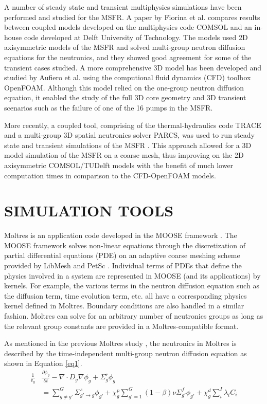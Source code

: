 \documentclass{anstrans}
\begin{document}
A number of steady state and transient multiphysics simulations have been performed and studied for the MSFR. A paper by Fiorina et al. \cite{fiorina_modelling_2014} compares results between coupled models developed on the multiphysics code COMSOL and an in-house code developed at Delft University of Technology. The models used 2D axisymmetric models of the MSFR and solved multi-group neutron diffusion equations for the neutronics, and they showed good agreement for some of the transient cases studied. A more comprehensive 3D model has been developed and studied by Aufiero et al. \cite{aufiero_development_2014} using the computional fluid dynamics (CFD) toolbox OpenFOAM. Although this model relied on the one-group neutron diffusion equation, it enabled the study of the full 3D core geometry and 3D transient scenarios such as the failure of one of the 16 pumps in the MSFR.

More recently, a coupled tool, comprising of the thermal-hydraulics code TRACE and a multi-group 3D spatial neutronics solver PARCS, was used to run steady state and transient simulations of the MSFR \cite{pettersen_coupled_2016}. This approach allowed for a 3D model simulation of the MSFR on a coarse mesh, thus improving on the 2D axisymmetric COMSOL/TUDelft models with the benefit of much lower computation times in comparison to the CFD-OpenFOAM models. 

\section{SIMULATION TOOLS}

Moltres is an application code developed in the MOOSE framework \cite{gaston_moose:_2009}. The MOOSE framework solves non-linear equations through the discretization of partial differential equations (PDE) on an adaptive coarse meshing scheme provided by LibMesh \cite{kirk_libmesh:_2006} and PetSc \cite{satish_balay_petsc_2015}. Individual terms of PDEs that define the physics involved in a system are represented in MOOSE (and its applications) by kernels. For example, the various terms in the neutron diffusion equation such as the diffusion term, time evolution term, etc. all have a corresponding physics kernel defined in Moltres. Boundary conditions are also handled in a similar fashion. Moltres can solve for an arbitrary number of neutronics groups as long as the relevant group constants are provided in a Moltres-compatible format.

As mentioned in the previous Moltres study \cite{lindsay_introduction_2018}, the neutronics in Moltres is described by the time-independent multi-group neutron diffusion equation as shown in Equation \ref{eq1}.
\begin{align}
\frac{1}{v_g} &\frac{\partial \phi_g}{\partial t} - \nabla \cdot D_g \nabla \phi_g + \Sigma^r_g \phi_g \nonumber \\ 
&= \sum^G_{g \neq g'} \Sigma^s_{g' \rightarrow g} \phi_{g'} + \chi^p_g \sum^G_{g'=1} (1-\beta) \nu \Sigma^f_{g'} \phi_{g'} + \chi^d_g \sum^I_i \lambda_i C_i \label{eq1}
\end{align}
\end{document}
